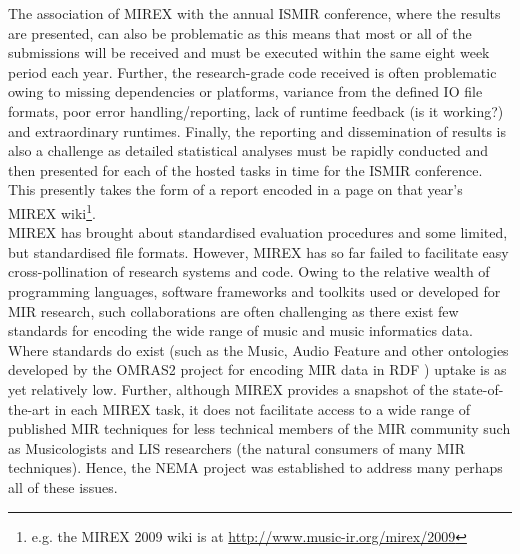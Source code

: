 \documentclass[conference]{IEEEtran}
\begin{document}
The association of MIREX with the annual ISMIR conference, where the results are presented, can also be problematic as this means that most or all of the submissions will be received and must be executed within the same eight week period each year. 
Further, the research-grade code received is often problematic owing to missing dependencies or platforms, variance from the defined IO file formats, poor error handling/reporting, lack of runtime feedback (is it working?) and extraordinary runtimes. 
Finally, the reporting and dissemination of results is also a challenge as detailed statistical analyses must be rapidly conducted and then presented for each of the hosted tasks in time for the ISMIR conference. This presently takes the form of a report encoded in a page on that year's MIREX wiki\footnote{e.g. the MIREX 2009 wiki is at \url{http://www.music-ir.org/mirex/2009}}.\\

MIREX has brought about standardised evaluation procedures and some limited, but standardised file formats.
However, MIREX has so far failed to facilitate easy cross-pollination of research systems and code. Owing to the relative wealth of programming languages, software frameworks and toolkits used or developed for MIR research, such collaborations are often challenging as there exist few standards for encoding the wide range of music and music informatics data. Where standards do exist (such as the Music, Audio Feature and other ontologies developed by the OMRAS2 project for encoding MIR data in RDF \cite{raimond2007music}) uptake is as yet relatively low.  
Further, although MIREX provides a snapshot of the state-of-the-art in each MIREX task, it does not facilitate access to a wide range of published MIR techniques for less technical members of the MIR community such as Musicologists and LIS researchers (the natural consumers of many MIR techniques). Hence, the NEMA project was established to address many perhaps all of these issues.
\end{document}
